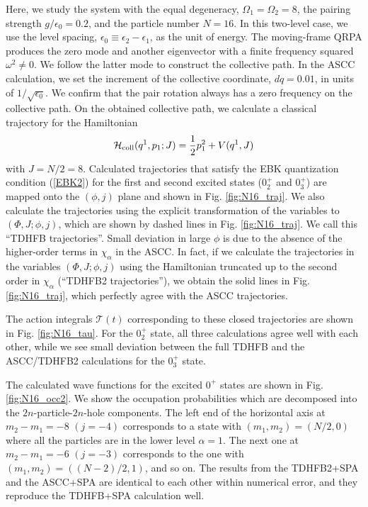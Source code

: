 \documentclass[11pt]{book} %
\begin{document}
Here, we study the system with the equal degeneracy,
$\Omega_1=\Omega_2=8$, 
the pairing strength $g/\epsilon_0=0.2$,
and the particle number $N=16$. 
In this two-level case, we use the level spacing,
$\epsilon_0\equiv \epsilon_2-\epsilon_1$,
as the unit of energy.
The moving-frame QRPA produces the zero mode and another eigenvector
with a finite frequency squared $\omega^2\neq 0$.
We follow the latter mode to construct the collective path.
In the ASCC calculation, we set the increment of the
collective coordinate, $dq=0.01$,
in units of $1/\sqrt{\epsilon_0}$.
We confirm that the pair rotation always has a zero frequency
on the collective path.
On the obtained collective path, we calculate a classical trajectory
for the Hamiltonian
\begin{equation}
\mathcal{H}_{\rm coll}(q^1,p_1;J)=\frac{1}{2} p_1^2 + V(q^1,J)
\end{equation}
with $J=N/2=8$.
Calculated trajectories that satisfy the EBK quantization condition
(\ref{EBK2}) for the first and second excited states ($0_2^+$ and $0_3^+$)
are mapped onto the $(\phi,j)$ plane and
shown in Fig. \ref{fig:N16_traj}.
We also calculate the trajectories using the explicit transformation
of the variables to $(\Phi,J;\phi,j)$, which
are shown by dashed lines in Fig. \ref{fig:N16_traj}.
We call this ``TDHFB trajectories''.
Small deviation in large $\phi$ is due to the absence of the higher-order
terms in $\chi_\alpha$ in the ASCC.
In fact, if we calculate the trajectories in the variables
$(\Phi,J;\phi,j)$ using the Hamiltonian truncated up to the
second order in $\chi_\alpha$ (``TDHFB2 trajectories''),
we obtain the solid lines in Fig. \ref{fig:N16_traj},
which perfectly agree with the ASCC trajectories.

The action integrals $\mathcal{T}(t)$ corresponding to
these closed trajectories are shown in Fig. \ref{fig:N16_tau}.
For the $0_2^+$ state,
all three calculations agree well
with each other, while we see small deviation between the full TDHFB
and the ASCC/TDHFB2 calculations for the $0_3^+$ state.

The calculated wave functions for the excited $0^+$ states 
are shown in Fig. \ref{fig:N16_occ2}. 
We show the occupation probabilities which are decomposed 
into the $2n$-particle-$2n$-hole components. 
The left end of the horizontal axis at $m_2-m_1=-8$ $(j=-4)$
corresponds to a state with $(m_1,m_2)=(N/2,0)$ where all the particles
are in the lower level $\alpha=1$.
The next one at $m_2-m_1=-6$ $(j=-3)$ corresponds to the one with
$(m_1,m_2)=((N-2)/2,1)$, and so on.
The results from the TDHFB2+SPA and the ASCC+SPA are identical to each other
within numerical error, and they reproduce
the TDHFB+SPA calculation well.
\end{document}
